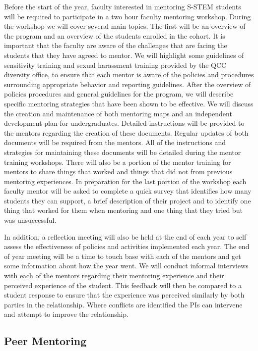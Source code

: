 \documentclass[12pt]{article}
\begin{document}
Before the start of the year, faculty interested in mentoring S-STEM students will be required to participate in a two hour faculty mentoring workshop.  During the workshop we will cover several main topics.  The first will be an overview of the program and an overview of the students enrolled in the cohort.  It is important that the faculty are aware of the challenges that are facing the students that they have agreed to mentor.  We will highlight some guidelines of sensitivity training and sexual harassment training provided by the  QCC diversity office, to ensure that each mentor is aware of the policies and procedures surrounding appropriate behavior and reporting guidelines.  After the overview of policies procedures and general guidelines for the program, we will describe specific mentoring strategies that have been shown to be effective. We will discuss the creation and maintenance of both mentoring maps and an independent development plan for undergraduates.  Detailed instructions will be provided to the mentors regarding the creation of these documents.  Regular updates of both documents will be required from the mentors.  All of the instructions and strategies for maintaining these documents will be detailed during the mentor training workshops.   There will also be a portion of the mentor training for mentors to share things that worked and things that did not from previous mentoring experiences.  In preparation for the last portion of the workshop each faculty mentor will be asked to complete a quick survey that identifies how many students they can support, a brief description of their project and to identify one thing that worked for them when mentoring and one thing that they tried but was unsuccessful. 

In addition, a reflection meeting will also be held at the end of each year to self assess the effectiveness of policies and activities implemented each year.  The end of year meeting will be a time to touch base with each of the mentors and get some information about how the year went.  We will conduct informal interviews with each of the mentors regarding their mentoring experience and their perceived experience of the student.  This feedback will then be compared to a student response to ensure that the experience was perceived similarly by both parties in the relationship.  Where conflicts are identified the PIs can intervene and attempt to improve the relationship.

\subsection{Peer Mentoring}
\end{document}
